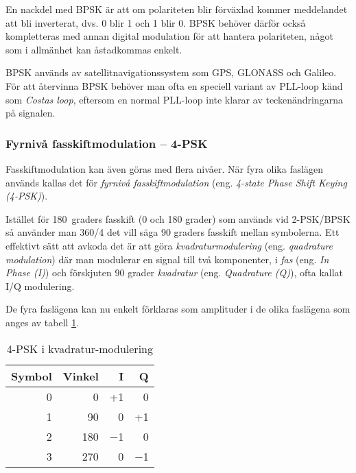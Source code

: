 En nackdel med BPSK är att om polariteten blir förväxlad kommer meddelandet
att bli inverterat, dvs. 0 blir 1 och 1 blir 0. BPSK behöver därför också
kompletteras med annan digital modulation för att hantera polariteten, något
som i allmänhet kan åstadkommas enkelt.

BPSK används av satellitnavigationssystem som GPS, GLONASS och Galileo.
För att återvinna BPSK behöver man ofta en speciell variant av PLL-loop känd
som \emph{Costas loop}, eftersom en normal PLL-loop inte klarar av
teckenändringarna på signalen.

\subsubsection{Fyrnivå fasskiftmodulation -- 4-PSK}

Fasskiftmodulation kan även göras med flera nivåer. När fyra olika faslägen
används kallas det för \emph{fyrnivå fasskiftmodulation} (eng.
\emph{4-state Phase Shift Keying (4-PSK)}).

Istället för 180~graders fasskift (0 och 180 grader) som används vid 2-PSK/BPSK
så använder man 360/4 det vill säga 90 graders fasskift mellan symbolerna.
Ett effektivt sätt att avkoda det är att göra \emph{kvadraturmodulering}
(eng. \emph{quadrature modulation}) där man modulerar en signal till två
komponenter, i \emph{fas} (eng. \emph{In Phase (I)}) och förskjuten 90 grader \emph{kvadratur} (eng.
\emph{Quadrature (Q)}), ofta kallat I/Q modulering.

De fyra faslägena kan nu enkelt förklaras som amplituder i de olika faslägena
som anges av tabell \ref{tab:4-PSK}.

\begin{table}[t]
\begin{center}
\begin{tabular}{|r|r|r|r|}
\hline
Symbol & Vinkel & I & Q \\ \hline
0 &   0 & +1       &  0 \\
1 &  90 &  0       & +1 \\
2 & 180 & \num{-1} &  0 \\
3 & 270 &  0       & \num{-1} \\ \hline
\end{tabular}
\end{center}
\caption{4-PSK i kvadratur-modulering}
\label{tab:4-PSK}
\end{table}

